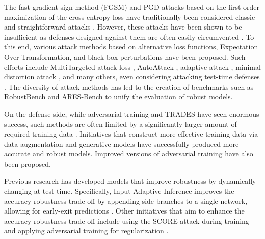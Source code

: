 \documentclass[11pt, letterpaper]{article}
\theoremstyle{plain}
\theoremstyle{definition}
\begin{document}
The fast gradient sign method (FGSM) and PGD attacks based on the first-order maximization of the cross-entropy loss have traditionally been considered classic and straightforward attacks \citep{Madry18, Goodfellow15}. However, these attacks have been shown to be insufficient as defenses designed against them are often easily circumvented \citep{Carlini17a, Athalye18a, Athalye18b, Papernot17}. To this end, various attack methods based on alternative loss functions, Expectation Over Transformation, and black-box perturbations have been proposed. Such efforts include MultiTargeted attack loss \citep{Gowal19}, AutoAttack \citep{Croce20a}, adaptive attack \citep{Tramer20}, minimal distortion attack \citep{Croce20b}, and many others, even considering attacking test-time defenses \citep{Croce22}. The diversity of attack methods has led to the creation of benchmarks such as RobustBench \citep{Croce20c} and ARES-Bench \citep{Liu23} to unify the evaluation of robust models.

On the defense side, while adversarial training \citep{Madry18} and TRADES \citep{Zhang19} have seen enormous success, such methods are often limited by a significantly larger amount of required training data \citep{Schmidt18}. Initiatives that construct more effective training data via data augmentation \citep{Rebuffi21, Gowal20, Gowal21} and generative models \citep{Sehwag22, Wang23} have successfully produced more accurate and robust models. Improved versions of adversarial training \citep{Jia22, Wang20, Shafahi19, Pagliardini22} have also been proposed.

Previous research has developed models that improve robustness by dynamically changing at test time. Specifically, Input-Adaptive Inference improves the accuracy-robustness trade-off by appending side branches to a single network, allowing for early-exit predictions \citep{Hu20}. Other initiatives that aim to enhance the accuracy-robustness trade-off include using the SCORE attack during training \citep{Pang22} and applying adversarial training for regularization \citep{Zheng21}.
\end{document}
